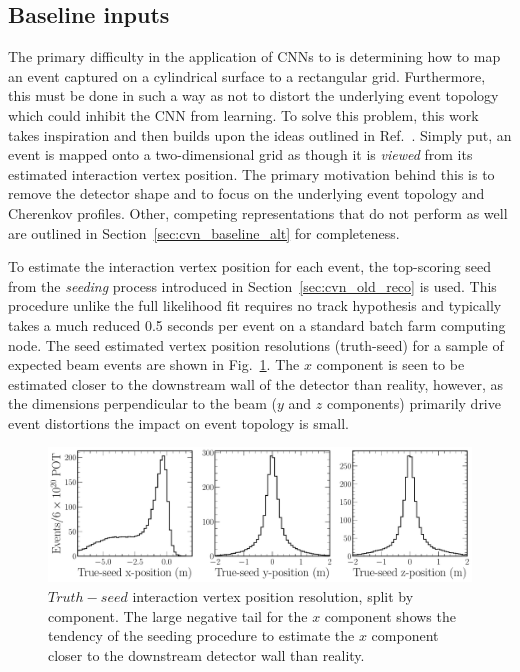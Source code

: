 \subsection{Baseline inputs} %
\label{sec:cvn_baseline_inputs} %

The primary difficulty in the application of CNNs to \chips is determining how to map an event
captured on a cylindrical surface to a rectangular grid. Furthermore, this must be done in such a
way as not to distort the underlying event topology which could inhibit the CNN from learning. To
solve this problem, this work takes inspiration and then builds upon the ideas outlined in
Ref.~\cite{theodore2016}. Simply put, an event is mapped onto a two-dimensional grid as though it
is \emph{viewed} from its estimated interaction vertex position. The primary motivation behind
this is to remove the detector shape and to focus on the underlying event topology and Cherenkov
profiles. Other, competing representations that do not perform as well are outlined in
Section~\ref{sec:cvn_baseline_alt} for completeness.

To estimate the interaction vertex position for each event, the top-scoring seed from the
\emph{seeding} process introduced in Section~\ref{sec:cvn_old_reco} is used. This procedure unlike
the full likelihood fit requires no track hypothesis and typically takes a much reduced 0.5
seconds per event on a standard batch farm computing node. The seed estimated vertex position
resolutions (truth-seed) for a sample of expected beam events are shown in
Fig.~\ref{fig:explore_true_reco_vtx}. The $x$ component is seen to be estimated closer to the
downstream wall of the detector than reality, however, as the dimensions perpendicular to the beam
($y$ and $z$ components) primarily drive event distortions the impact on event topology is small.

\begin{figure} %
    \includegraphics[width=\textwidth]{diagrams/6-cvn/chipsnet/explore_true_reco_vtx.pdf}
    \caption[Seed interaction vertex resolutions.]
    {$Truth - seed$ interaction vertex position resolution, split by component. The large negative
        tail for the $x$ component shows the tendency of the seeding procedure to estimate the $x$
        component closer to the downstream detector wall than reality.}
    \label{fig:explore_true_reco_vtx}
\end{figure}

